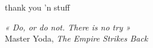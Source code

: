 
\emptypage


thank you 'n stuff

\emptypage


\singlespace
\dominitoc
\renewcommand{\leftmark}{Contents}

\tableofcontents

\emptypage


\onehalfspacing
\setcounter{page}{1}

\begin{center}
\begin{minipage}{0.95\textwidth}
\emph{« Do, or do not. There is no try »}\\
\hspace*{0.4\textwidth} Master Yoda, \emph{The Empire Strikes Back}
\end{minipage}
\end{center}

\vspace*{0.5cm}







\newpage



